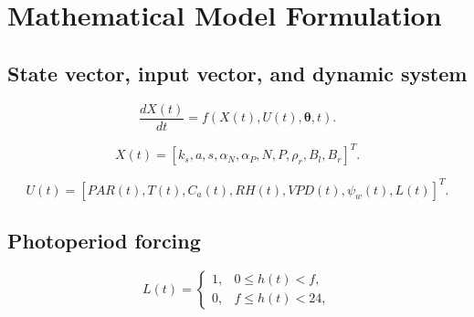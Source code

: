 \documentclass[a4paper,fleqn]{cas-dc}
\begin{document}
\section{Mathematical Model Formulation}
\label{sec:model}


\subsection{State vector, input vector, and dynamic system}

\begin{equation}
    \frac{dX(t)}{dt} = f\left(X(t), U(t), \boldsymbol{\theta}, t\right).
\end{equation}

\begin{equation}
X(t) =
\left[
k_s,
a,
s,
\alpha_N,
\alpha_P,
N,
P,
\rho_r,
B_l,
B_r
\right]^T .
\end{equation}


\begin{equation}
U(t) =
\left[
PAR(t),
T(t),
C_a(t),
RH(t),
VPD(t),
\psi_w(t),
L(t)
\right]^T .
\end{equation}


\subsection{Photoperiod forcing}

\begin{equation}
L(t) =
\begin{cases}
1, & 0 \leq h(t) < f, \\
0, & f \leq h(t) < 24,
\end{cases}
\end{equation}
\end{document}
